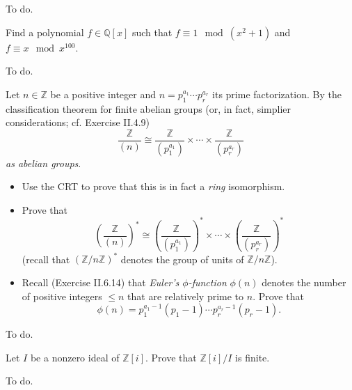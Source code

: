 \documentclass[../../master.tex]{subfiles}
\begin{document}
\begin{solution}
    To do.
\end{solution}

\begin{problem}
    Find a polynomial $f \in \mathbb{Q}[x]$ such that $f \equiv 1 \mod (x^2 + 1)$ and $f \equiv x \mod x^{100}$.
\end{problem}

\begin{solution}
    To do.
\end{solution}

\begin{problem}
    Let $n \in \mathbb{Z}$ be a positive integer and $n = p_1^{a_1} \cdots  p_r^{a_r}$ its prime factorization.
    By the classification theorem for finite abelian groups (or, in fact, simplier considerations; cf. Exercise II.4.9)
    \[
        \frac{\mathbb{Z}}{(n)} \cong \frac{\mathbb{Z}}{(p_1^{a_1})} \times \cdots \times \frac{\mathbb{Z}}{(p_r^{a_r})}
    \]
    \textit{as abelian groups}.
    \begin{itemize}
        \item Use the CRT to prove that this is in fact a \textit{ring} isomorphism.
        \item Prove that
            \[
                \left( \frac{\mathbb{Z}}{(n)}\right)^{*} \cong \left( \frac{\mathbb{Z}}{(p_1^{a_1})}\right)^{*} \times \cdots \times \left( \frac{\mathbb{Z}}{(p_r^{a_r})}\right)^{*}
            \]
            (recall that $(\mathbb{Z} / n\mathbb{Z})^{*}$ denotes the group of units of $\mathbb{Z} / n\mathbb{Z}$).
        \item Recall (Exercise II.6.14) that \textit{Euler's $\phi$-function} $\phi(n)$ denotes the number of positive integers $\leq n$ that are relatively prime to $n$. 
            Prove that
            \[
                \phi(n) = p_1^{a_1 - 1}(p_1 - 1) \cdots p_r^{a_r - 1}(p_r - 1).
            \]
    \end{itemize}
\end{problem}

\begin{solution}
    To do.
\end{solution}

\begin{problem}
    Let $I$ be a nonzero ideal of $\mathbb{Z}[i]$. 
    Prove that $\mathbb{Z}[i] / I$ is finite.
\end{problem}

\begin{solution}
    To do.
\end{solution}
\end{document}
